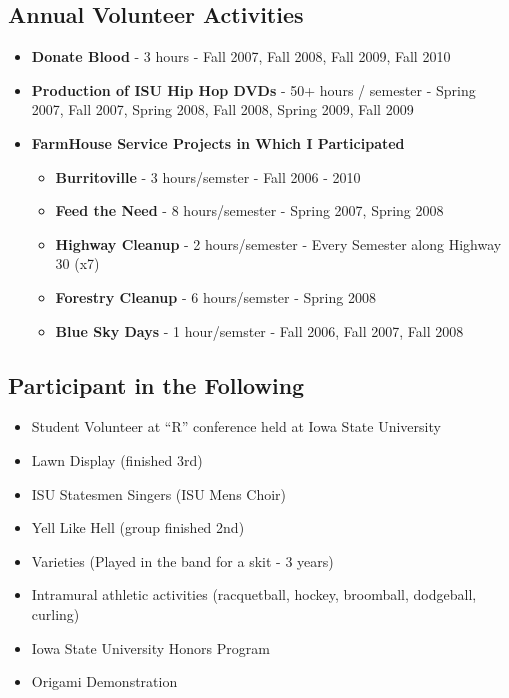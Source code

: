 \documentclass[oneside]{article}
\begin{document}
\subsection{Annual Volunteer Activities}
\begin{itemize}

\item{\bf Donate Blood} - 3 hours - Fall 2007, Fall 2008, Fall 2009, Fall 2010
\item{\bf Production of ISU Hip Hop DVDs} - 50+ hours / semester - Spring 2007, Fall 2007, Spring 2008, Fall 2008, Spring 2009, Fall 2009
\item{\bf FarmHouse Service Projects in Which I Participated}
\begin{itemize} \itemsep 0in
\item{\bf Burritoville} - 3 hours/semster - Fall 2006 - 2010
\item{\bf Feed the Need} - 8 hours/semester - Spring 2007, Spring 2008
\item{\bf Highway Cleanup} - 2 hours/semester - Every Semester along Highway 30 (x7)
\item{\bf Forestry Cleanup} - 6 hours/semster - Spring 2008
\item{\bf Blue Sky Days} - 1 hour/semster - Fall 2006, Fall 2007, Fall 2008
\end{itemize}
\end{itemize}

\subsection{Participant in the Following}
\begin{itemize} \itemsep 0in
\item Student Volunteer at ``R'' conference held at Iowa State University
\item Lawn Display (finished 3rd)
\item ISU Statesmen Singers (ISU Mens Choir)
\item Yell Like Hell (group finished 2nd)
\item Varieties (Played in the band for a skit - 3 years)
\item Intramural athletic activities (racquetball, hockey, broomball, dodgeball, curling)
\item Iowa State University Honors Program
\item Origami Demonstration
\end{itemize}
\end{document}
